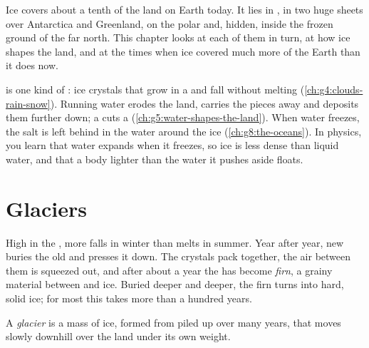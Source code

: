 Ice covers about a tenth of the land on Earth today. It lies in 
, in two huge sheets over Antarctica and Greenland, on the polar
 and, hidden, inside the frozen ground of the far north. This chapter
looks at each of them in turn, at how ice shapes the land, and at the
times when ice covered much more of the Earth than it does now.

\begin{recall}
 is one kind of : ice crystals that grow in a  and
fall without melting (\cref{ch:g4:clouds-rain-snow}). Running water
erodes the land, carries the pieces away and deposits them further down;
a  cuts a  (\cref{ch:g5:water-shapes-the-land}). When 
water freezes, the salt is left behind in the water around the ice
(\cref{ch:g8:the-oceans}). In physics, you learn that water expands when
it freezes, so ice is less dense than liquid water, and that a body
lighter than the water it pushes aside floats.
\end{recall}

\section{Glaciers}

High in the , more  falls in winter than melts in summer.
Year after year, new  buries the old  and presses it down. The
crystals pack together, the air between them is squeezed out, and after
about a year the  has become \emph{firn}, a grainy material between
 and ice. Buried deeper and deeper, the firn turns into hard, solid
ice; for most  this takes more than a hundred years.

\begin{definition}[Glacier]\label{def:g8:ice-on-earth:glacier}
A \emph{glacier} is a mass of ice, formed from  piled up over many
years, that moves slowly downhill over the land under its own weight.
\end{definition}

